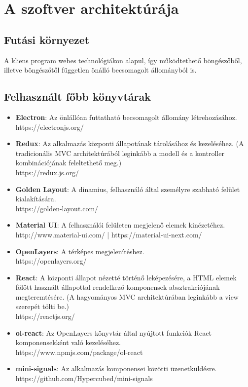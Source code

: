 \section{A szoftver architektúrája}

\subsection{Futási környezet}

A kliens program webes technológiákon alapul, így működtethető böngészőből,
illetve böngészőtől független önálló becsomagolt állományból is.

\subsection{Felhasznált főbb könyvtárak}

\begin{itemize}
  \item \textbf{Electron}: Az önlállóan futtatható becsomagolt állomány
  létrehozásához. \\
  https://electronjs.org/

  \item \textbf{Redux}: Az alkalmazás központi állapotának tárolásához és
  kezeléséhez. (A tradicionális MVC architektúrából leginkább a modell és a
  kontroller kombinációjának feleltethető meg.) \\
  https://redux.js.org/

  \item \textbf{Golden Layout}: A dinamius, felhasználó által személyre szabható
  felület kialakítására. \\
  https://golden-layout.com/

  \item \textbf{Material UI}: A felhasználói felületen megjelenő elemek
  kinézetéhez. \\
  http://www.material-ui.com/ | https://material-ui-next.com/

  \item \textbf{OpenLayers}: A térképes megjelenítéshez. \\
  https://openlayers.org/

  \item \textbf{React}: A központi állapot nézetté történő leképezésére, a HTML
  elemek fölött használt állapottal rendelkező komponensek absztrakciójának
  megteremtésére. (A hagyományos MVC architektúrában leginkább a view szerepét
  tölti be.) \\
  https://reactjs.org/

  \item \textbf{ol-react}: Az OpenLayers könyvtár által nyújtott funkciók React
  komponensekként való kezeléséhez. \\
  https://www.npmjs.com/package/ol-react

  \item \textbf{mini-signals}: Az alkalmazás komponensei közötti üzenetküldésre.
  \\
  https://github.com/Hypercubed/mini-signals
\end{itemize}

